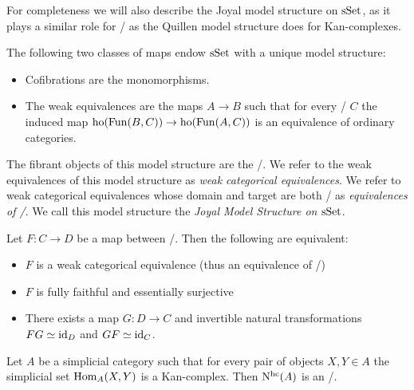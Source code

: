 For completeness we will also describe the Joyal model structure on $\operatorname{sSet}$, as it plays a similar role for \inftycats/ as the Quillen model structure does for Kan-complexes.
\begin{thm}
    The following two classes of maps endow $\operatorname{sSet}$ with a unique model structure:
    \begin{itemize}
        \item Cofibrations are the monomorphisms.
        \item The weak equivalences are the maps $A\to B$ such that for every \inftycat/ $C$ the induced map $\operatorname{ho}(\operatorname{Fun}(B,C))\to\operatorname{ho}(\operatorname{Fun}(A,C))$ is an equivalence of ordinary categories.
    \end{itemize}
    The fibrant objects of this model structure are the \inftycats/.
    We refer to the weak equivalences of this model structure as \emph{weak categorical equivalences}.
    We refer to weak categorical equivalences whose domain and target are both \inftycats/ as \emph{equivalences of \inftycats/}.
    We call this model structure the \emph{Joyal Model Structure on $\operatorname{sSet}$}.
    \begin{reference}
        \cite[Definition 3.3.7 and Theorem 3.6.8]{cisinski_2019}
    \end{reference}
\end{thm}
\begin{prop}
    Let $F\colon C\to D$ be a map between \inftycats/.
    Then the following are equivalent:
    \begin{itemize}
        \item $F$ is a weak categorical equivalence (thus an equivalence of \inftycats/)
        \item $F$ is fully faithful and essentially surjective %
        \item There exists a map $G\colon D\to C$ and invertible natural transformations $FG\simeq \text{id}_D$ and $GF\simeq \text{id}_C$.
    \end{itemize}
    \begin{reference}
        \cite[Corollary 3.6.6 and Theorem 3.9.7]{cisinski_2019}
    \end{reference}
\end{prop}
\begin{prop}
    Let $A$ be a simplicial category such that for every pair of objects $X,Y\in A$ the simplicial set $\operatorname{Hom}_A(X,Y)$ is a Kan-complex.
    Then $\operatorname{N^{hc}}(A)$ is an \inftycat/.
    \begin{reference}
        \cite[Theorem 2.4.5.1]{kerodon}
    \end{reference}
\end{prop}
